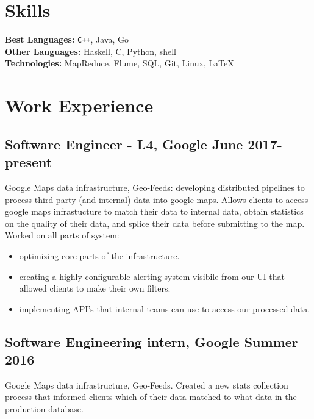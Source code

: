 \documentclass[5pt]{resume}
\begin{document}


{\color{titleColor}\section{Skills}}
\noindent\textbf{Best Languages:} {\color{default} \verb!C++!, Java, Go }\\
\textbf{Other Languages:} {\color{default} Haskell, C, Python, shell} \\
\textbf{Technologies:} {\color{default} MapReduce, Flume, SQL, Git, Linux, \LaTeX } 

{\color{titleColor} \section{Work Experience}}

\subsection{\textbf{Software Engineer - L4, Google \hfill June 2017-present}}
{\color{default} Google Maps data infrastructure, Geo-Feeds: developing 
  distributed pipelines to process third party (and internal) data into google 
  maps. Allows clients to access google maps infrastucture to match their data 
  to internal data, obtain statistics on the quality of their data, and splice
  their data before submitting to the map.
  Worked on all parts of system:
  \begin{itemize}
	\itemsep0em 
  	\item optimizing core parts of the infrastructure.
  	\item creating a highly configurable alerting system visibile from our UI that allowed clients to make their own filters.
	\item implementing API's that internal teams can use to access our processed data.
\end{itemize}
}

\subsection{\textbf{Software Engineering intern, Google \hfill Summer 2016}}
{\color{default} Google Maps data infrastructure, Geo-Feeds. Created a new stats collection process that informed clients which of their data matched to what data in the production database.}
\end{document}
